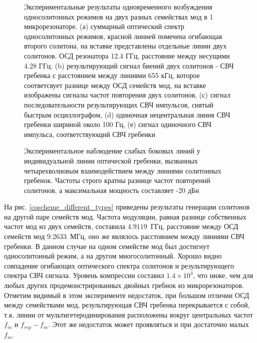 \begin{figure}[ht]
\begin{minipage}[ht]{1\linewidth}
\end{minipage}
\caption{Экспериментальные результаты одновременного возбуждения односолитонных режимов на двух разных семействах мод в 1 микрорезонаторе. (а) суммарный оптический спектр односолитонных режимов, красной линией помечена огибающая второго солитона, на вставке представлены отдельные линии двух солитонов. ОСД резонатора 12.4 ГГц, расстояние между несущими 4.28 ГГц. (b) результирующий сигнал биений двух солитонов - СВЧ гребенка с расстоянием между линиями 655 кГц, которое соответсвует разнице между ОСД семейств мод, на вставке изображены сигналы частот повторения двух солитонов, (с) сигнал последовательности результирующих СВЧ импульсов, снятый быстрым осциллографом, (d) одиночная нецентральная линия СВЧ гребенки шириной около 100 Гц, (е) сигнал одиночного СВЧ импульса, соответствующий СВЧ гребенки}
\label{Co_Scheme_results}
\end{figure}

\begin{figure}[ht]
\begin{minipage}[ht]{1\linewidth}
\end{minipage}
\caption{Экспериментальное наблюдение слабых боковых линий у индивидуальной линии оптической гребенки, вызванных четырехволновым взаимодействием между линиями солитонных гребенок. Частоты строго кратны разнице частот повторений солитонов, а максимальная мощность составляет -20 дБн}
\label{fig4_intermodulation}
\end{figure}

На рис. \ref{coscheme_different_types} приведены результаты генерации солитонов на другой паре семейств мод. Частота модуляции, равная разнице собственных частот мод из двух семейств, составила $4.9119$~ГГц, расстояние между ОСД семейств мод 9.2633~МГц, оно же являлось расстоянием между линиями СВЧ гребенки. В данном случае на одном семействе мод был достигнут односолитонный режим, а на другом многосолитонный. Хорошо видно совпадение огибающих оптического спектра солитонов и результирующего спектра СВЧ сигнала. Уровень компрессии составил $1.4\times10^3$, что ниже, чем для любых других продемонстрированных двойных гребнок из микрорезонаторов. Отметим видимый в этом эксперименте недостаток, при большом отличии ОСД между семействами мод, результирующая СВЧ гребенка перекрывается с собой, т.к. линии от мультигетеродинирования расположены вокруг центральных частот $f_m$ и $f_{rep}-f_m$. Этот же недостаток может проявляться и при достаточно малых $f_m$.

